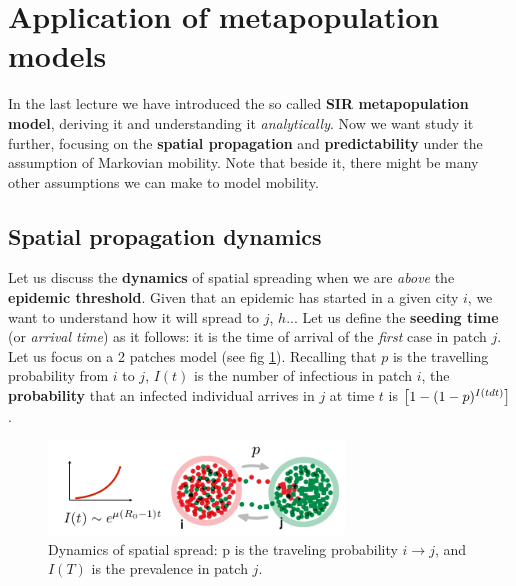 \documentclass[../main/main.tex]{subfiles}
\begin{document}

\section{Application of metapopulation models}

In the last lecture we have introduced the so called \textbf{SIR metapopulation model}, deriving it and understanding it \textit{analytically}. Now we want study it further, focusing on the \textbf{spatial propagation} and \textbf{predictability} under the assumption of Markovian mobility. Note that beside it, there might be many other assumptions we can make to model mobility.

\subsection{Spatial propagation dynamics}

Let us discuss the \textbf{dynamics} of spatial spreading when we are \textit{above} the \textbf{epidemic threshold}. Given that an epidemic has started in a given city $i$, we want to understand how it will spread to $j$, $h$... Let us define the \textbf{seeding time} (or \textit{arrival time}) as it follows: it is the time of arrival of the \textit{first} case in patch $j$. Let us focus on a 2 patches model (see fig \ref{fig:14_01}). Recalling that $p$ is the travelling probability from $i$ to $j$, $I(t)$ is the number of infectious in patch $i$, the \textbf{probability} that an infected individual arrives in $j$ at time $t$ is \( \qty[1-(1-p)^{I(tdt)}] \).

\begin{figure}[h!]
\centering
\includegraphics[width=0.7\textwidth]{../lessons/image/15/image01.png}
\caption{\label{fig:14_01} Dynamics of spatial spread: p is the traveling probability $i \to j$, and $I(T)$ is the prevalence in patch $j$.}
\end{figure}
\end{document}
